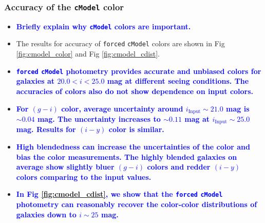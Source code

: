 \documentclass[useamsfonts]{pasj01}
\def\cmodel{\texttt{cModel}}
\def\forced{\texttt{forced}}
\newcommand{\plan}[1]{\textcolor{blue} {\textbf{#1}}}
\begin{document}
\subsubsection{Accuracy of the \cmodel{} color}

    \begin{itemize}

        \item \plan{Briefly explain why \cmodel{} colors are important.}

        \item The results for accuracy of \forced{} \cmodel{} colors are shown in
            Fig \ref{fig:cmodel_color} and Fig \ref{fig:cmodel_cdist}.

        \item \plan{\forced{} \cmodel{} photometry provides accurate and unbiased
            colors for galaxies at $20.0 < i < 25.0$ mag at different seeing conditions.
            The accuracies of colors also do not show dependence on input colors.
            }

        \item \plan{For $(g-i)$ color, average uncertainty around
            $i_{\mathrm{Input}}{\sim}21.0$ mag is ${\sim}0.04$ mag.
            The uncertainty increases to ${\sim}0.11$ mag at
            $i_{\mathrm{Input}}{\sim}25.0$ mag.
            Results for $(i-y)$ color is similar.}

        \item \plan{High blendedness can increase the uncertainties of the color
            and bias the color measurements.
            The highly blended galaxies on average show slightly bluer $(g-i)$ colors
            and redder $(i-y)$ colors comparing to the input values.}

        \item \plan{In Fig \ref{fig:cmodel_cdist}, we show that the \forced{} \cmodel{}
            photometry can reasonably recover the color-color distributions of galaxies
            down to $i{\sim}25$ mag.
            }

    \end{itemize}

\end{document}
